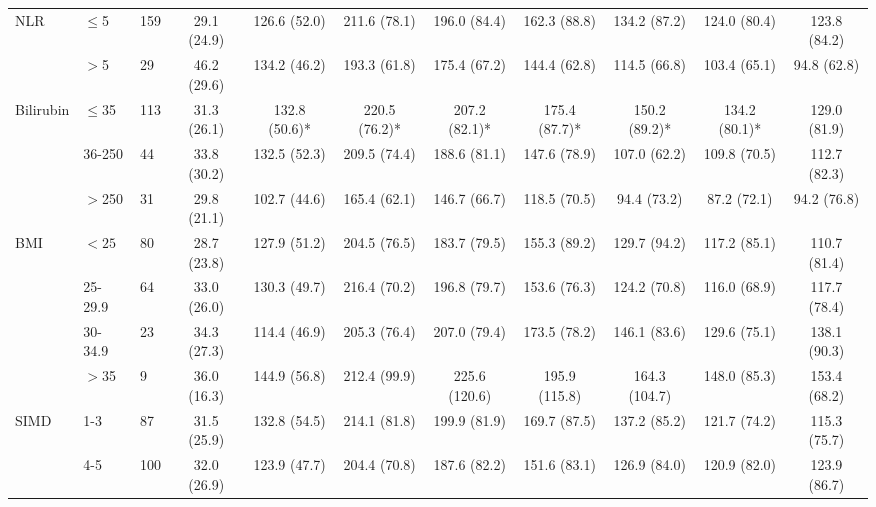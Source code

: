 \begin{sidewaystable}[p]
\begin{tabular}{|l ll | c c c c c c c c|}
		NLR                 & $\leq$5   & 159   & 29.1 (24.9)  & 126.6 (52.0)  & 211.6 (78.1)  & 196.0 (84.4)  & 162.3 (88.8)  & 134.2 (87.2)  & 124.0 (80.4)  & 123.8 (84.2)  \\
		                    & $>$5      & 29    & 46.2 (29.6)  & 134.2 (46.2)  & 193.3 (61.8)  & 175.4 (67.2)  & 144.4 (62.8)  & 114.5 (66.8)  & 103.4 (65.1)  & 94.8 (62.8)   \\
		Bilirubin           & $\leq$35  & 113   & 31.3 (26.1)  & 132.8 (50.6)* & 220.5 (76.2)* & 207.2 (82.1)* & 175.4 (87.7)* & 150.2 (89.2)* & 134.2 (80.1)* & 129.0 (81.9)  \\
		                    & 36-250    & 44    & 33.8 (30.2)  & 132.5 (52.3)  & 209.5 (74.4)  & 188.6 (81.1)  & 147.6 (78.9)  & 107.0 (62.2)  & 109.8 (70.5)  & 112.7 (82.3)  \\
		                    & $>$250    & 31    & 29.8 (21.1)  & 102.7 (44.6)  & 165.4 (62.1)  & 146.7 (66.7)  & 118.5 (70.5)  & 94.4 (73.2)   & 87.2 (72.1)   & 94.2 (76.8)   \\
		BMI                 & $<25$     & 80    & 28.7 (23.8)  & 127.9 (51.2)  & 204.5 (76.5)  & 183.7 (79.5)  & 155.3 (89.2)  & 129.7 (94.2)  & 117.2 (85.1)  & 110.7 (81.4)  \\
		                    & 25-29.9   & 64    & 33.0 (26.0)  & 130.3 (49.7)  & 216.4 (70.2)  & 196.8 (79.7)  & 153.6 (76.3)  & 124.2 (70.8)  & 116.0 (68.9)  & 117.7 (78.4)  \\
		                    & 30-34.9   & 23    & 34.3 (27.3)  & 114.4 (46.9)  & 205.3 (76.4)  & 207.0 (79.4)  & 173.5 (78.2)  & 146.1 (83.6)  & 129.6 (75.1)  & 138.1 (90.3)  \\
		                    & $>$35     & 9     & 36.0 (16.3)  & 144.9 (56.8)  & 212.4 (99.9)  & 225.6 (120.6) & 195.9 (115.8) & 164.3 (104.7) & 148.0 (85.3)  & 153.4 (68.2)  \\
		SIMD                & 1-3       & 87    & 31.5 (25.9)  & 132.8 (54.5)  & 214.1 (81.8)  & 199.9 (81.9)  & 169.7 (87.5)  & 137.2 (85.2)  & 121.7 (74.2)  & 115.3 (75.7)  \\
		                    & 4-5       & 100   & 32.0 (26.9)  & 123.9 (47.7)  & 204.4 (70.8)  & 187.6 (82.2)  & 151.6 (83.1)  & 126.9 (84.0)  & 120.9 (82.0)  & 123.9 (86.7)  \\

\end{tabular}
\end{sidewaystable}
